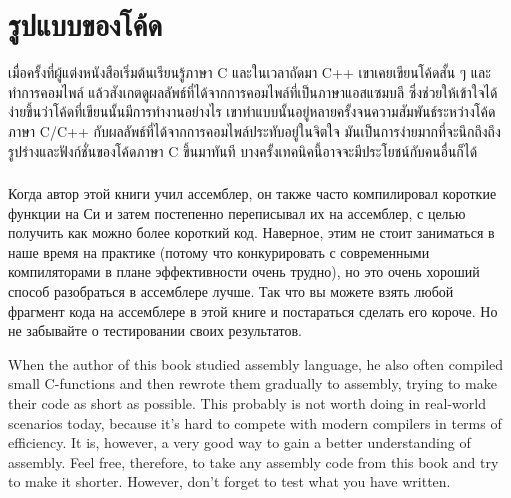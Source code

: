 \ifdefined\THAI
\part{รูปแบบของโค้ด}

เมื่อครั้งที่ผู้แต่งหนังสือเริ่มต้นเรียนรู้ภาษา C และในเวลาถัดมา C++ เขาเคยเขียนโค้ดสั้น ๆ และทำการคอมไพล์ แล้วสังเกตดูผลลัพธ์ที่ได้จากการคอมไพล์ที่เป็นภาษาแอสแซมบลี ซึ่งช่วยให้เข้าใจได้ง่ายขึ้นว่าโค้ดที่เขียนนั้นมีการทำงานอย่างไร เขาทำแบบนั้นอยู่หลายครั้งจนความสัมพันธ์ระหว่างโค้ดภาษา C/C++ กับผลลัพธ์ที่ได้จากการคอมไพล์ประทับอยู่ในจิตใจ มันเป็นการง่ายมากที่จะนึกถึงถึงรูปร่างและฟังก์ชั่นของโค้ดภาษา C ขึ้นมาทันที บางครั้งเทคนิคนี้อาจจะมีประโยชน์กับคนอื่นก็ได้	
\fi %

\ifdefined\IncludeExercises
\section*{\Exercises}

\ifdefined\RUSSIAN
Когда автор этой книги учил ассемблер, он также часто компилировал короткие функции на Си и затем постепенно 
переписывал их на ассемблер, с целью получить как можно более короткий код.
Наверное, этим не стоит заниматься в наше время на практике (потому что конкурировать с современными
компиляторами в плане эффективности очень трудно), но это очень хороший способ разобраться в ассемблере
лучше.
Так что вы можете взять любой фрагмент кода на ассемблере в этой книге и постараться сделать его короче.
Но не забывайте о тестировании своих результатов.
\fi %

\ifdefined\ENGLISH
When the author of this book studied assembly language, he also often compiled small C-functions and then rewrote
them gradually to assembly, trying to make their code as short as possible.
This probably is not worth doing in real-world scenarios today, 
because it's hard to compete with modern compilers in terms of efficiency. It is, however, a very good way to gain a better understanding of assembly.
Feel free, therefore, to take any assembly code from this book and try to make it shorter.
However, don't forget to test what you have written.
\fi %

